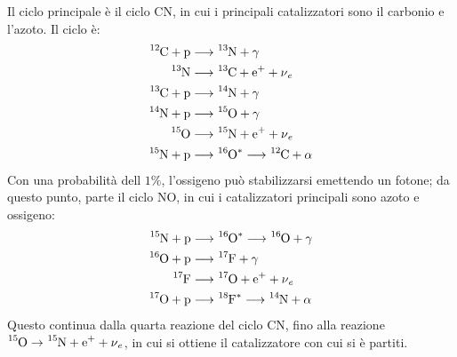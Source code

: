 \documentclass[11pt, a4paper]{scrartcl}
\theoremstyle{style}
\theoremstyle{style1}
\numberwithin{equation}{subsection}
\begin{document}
Il ciclo principale \`e il ciclo CN, in cui i principali catalizzatori sono il carbonio e l'azoto. 
Il ciclo \`e:
\[
\begin{split}
	\ce{^{12}C + p }&\longrightarrow \ce{^{13}N + \gamma}\\
	\ce{^{13}N } &\longrightarrow \ce{^{13}C + e+ + \nu _e}\\
	\ce{^{13}C + p }&\longrightarrow \ce{^{14}N + \gamma}\\
	\ce{^{14}N + p}&\longrightarrow \ce{^{15}O + \gamma}\\
	\ce{^{15}O} & \longrightarrow \ce{^{15}N + e+ + \nu _e}\\
	\ce{^{15}N + p}&\longrightarrow \ce{^{16}O^*} \longrightarrow \ce{^{12}C + \alpha}
\end{split}
\] 
Con una probabilit\`a dell $1\%$, l'ossigeno pu\`o stabilizzarsi emettendo un fotone; da questo punto, parte il ciclo NO, in cui i catalizzatori principali sono azoto e ossigeno:
\[
\begin{split}
	\ce{^{15}N + p}&\longrightarrow \ce{^{16}O^*} \longrightarrow \ce{^{16}O + \gamma }\\
	\ce{^{16}O + p}&\longrightarrow \ce{^{17}F + \gamma}\\
	\ce{^{17}F} &\longrightarrow \ce{^{17}O + e+ + \nu _e}\\
	\ce{^{17}O + p}&\longrightarrow \ce{^{18}F^*} \longrightarrow \ce{^{14}N + \alpha }
\end{split}
\] 
Questo continua dalla quarta reazione del ciclo CN, fino alla reazione $\ce{^{15}O}\to \ce{^{15}N + e+ + \nu _e}$, in cui si ottiene il catalizzatore con cui si \`e partiti.
\end{document}
